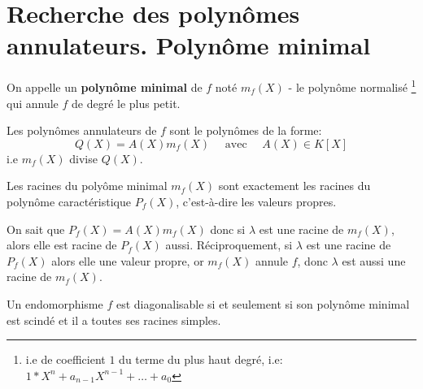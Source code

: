 \section{Recherche des polynômes annulateurs. Polynôme minimal}
\begin{definition}
    On appelle un  \textbf{polynôme minimal} de $f$ noté  $m_f(X)$ - le polynôme normalisé \footnote{i.e de coefficient $1$ du terme du plus haut degré, i.e:  $1*X^n + a_{n-1}X^{n-1} + \ldots + a_0$} qui annule $f$ de degré le plus petit.
\end{definition}
\begin{prop}
   Les polynômes annulateurs de $f$ sont le polynômes de la forme:
   \[
       Q(X) = A(X)m_f(X) \quad \text{ avec } \quad A(X) \in K[X]
   \] 
   i.e $m_f(X)$ divise  $Q(X)$. 
\end{prop}
\begin{prop}
   Les racines du polyôme minimal $m_f(X)$ sont exactement les racines du polynôme caractéristique  $P_f(X)$, c'est-à-dire les valeurs propres.
\end{prop}
\begin{preuve}
   On sait que $P_f(X) = A(X)m_f(X)$ donc si  $\lambda$ est une racine de  $m_f(X)$,  alors elle est racine de  $P_f(X)$ aussi. Réciproquement, si $\lambda$ est une racine de  $P_f(X)$ alors elle une valeur propre, or  $m_f(X)$ annule  $f$, donc  $\lambda$ est aussi une racine de  $m_f(X)$.
\end{preuve}
\begin{theorem}
    Un endomorphisme $f$ est diagonalisable si et seulement si son polynôme minimal est scindé et il a toutes ses racines simples.
\end{theorem}
